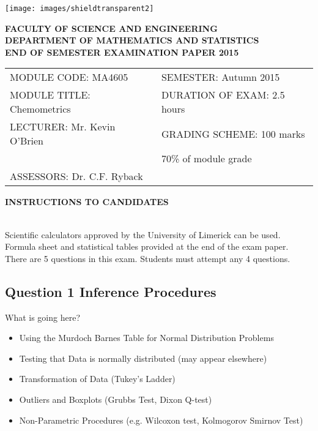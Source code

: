 \documentclass[a4paper,12pt]{article}
\begin{document}
	\begin{center}
		\texttt{[image: images/shieldtransparent2]}
	\end{center}
	
	\begin{center}
		\vspace{1cm}
		\large \bf {FACULTY OF SCIENCE AND ENGINEERING} \\[0.5cm]
		\normalsize DEPARTMENT OF MATHEMATICS AND STATISTICS \\[1.25cm]
		\large \bf {END OF SEMESTER EXAMINATION PAPER 2015} \\[1.5cm]
	\end{center}
	
	\begin{tabular}{ll}
		MODULE CODE: MA4605 & SEMESTER: Autumn 2015 \\[1cm]
		MODULE TITLE: Chemometrics& DURATION OF EXAM: 2.5 hours  \\[1cm]
		LECTURER: Mr. Kevin O'Brien & GRADING SCHEME: 100 marks \\
		& \phantom{GRADING SCHEME:} \footnotesize {70\% of module grade} \\[1cm]
		ASSESSORS: Dr. C.F. Ryback &  \\[1cm]
		
	\end{tabular}
	\vspace{-0.5cm}
	\begin{center}
		{\bf INSTRUCTIONS TO CANDIDATES}
	\end{center}
	
	{\noindent \\ Scientific calculators approved by the University of Limerick can be used. \\
		Formula sheet and statistical tables provided at the end of the exam paper.\\
		There are 5 questions in this exam. Students must attempt any 4 questions.}
	\newpage
	\subsection*{Question 1 Inference Procedures}
	
	\begin{framed}
		What is going here?
		\begin{itemize}
			\item Using the Murdoch Barnes Table for Normal Distribution Problems
			\item Testing that Data is normally distributed (may appear elsewhere)
			\item Transformation of Data (Tukey's Ladder)
			\item Outliers and Boxplots (Grubbs Test, Dixon Q-test)
			\item Non-Parametric Procedures (e.g. Wilcoxon test, Kolmogorov Smirnov Test)
		\end{itemize}
	\end{framed}
\newpage
\end{document}
